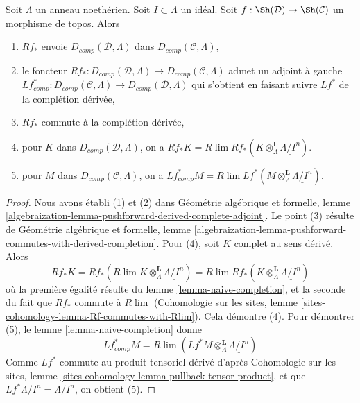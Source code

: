 \begin{lemma}
\label{lemma-pushforward-Noetherian-case}
Soit $\Lambda$ un anneau noethérien. Soit $I \subset \Lambda$ un idéal.
Soit $f : \Sh(\mathcal{D}) \to \Sh(\mathcal{C})$ un morphisme de topos.
Alors
\begin{enumerate}
\item $Rf_*$ envoie $D_{comp}(\mathcal{D}, \Lambda)$
dans $D_{comp}(\mathcal{C}, \Lambda)$,
\item le foncteur $Rf_* : D_{comp}(\mathcal{D}, \Lambda) \to
D_{comp}(\mathcal{C}, \Lambda)$ admet un adjoint à gauche
$Lf_{comp}^* : D_{comp}(\mathcal{C}, \Lambda) \to
D_{comp}(\mathcal{D}, \Lambda)$ qui s'obtient en faisant suivre $Lf^*$ de la
complétion dérivée,
\item $Rf_*$ commute à la complétion dérivée,
\item pour $K$ dans $D_{comp}(\mathcal{D}, \Lambda)$, on a
$Rf_*K = R\lim Rf_*(K \otimes^\mathbf{L}_\Lambda \underline{\Lambda/I^n})$.
\item pour $M$ dans $D_{comp}(\mathcal{C}, \Lambda)$, on a
$Lf^*_{comp}M =
R\lim Lf^*(M \otimes^\mathbf{L}_\Lambda \underline{\Lambda/I^n})$.
\end{enumerate}
\end{lemma}

\begin{proof}
Nous avons établi (1) et (2) dans
Géométrie algébrique et formelle, lemme
\ref{algebraization-lemma-pushforward-derived-complete-adjoint}.
Le point (3) résulte de
Géométrie algébrique et formelle, lemme
\ref{algebraization-lemma-pushforward-commutes-with-derived-completion}.
Pour (4), soit $K$ complet au sens dérivé. Alors
$$
Rf_*K = Rf_*( R\lim K \otimes^\mathbf{L}_\Lambda \underline{\Lambda/I^n}) =
R\lim Rf_*(K \otimes^\mathbf{L}_\Lambda \underline{\Lambda/I^n})
$$
où la première égalité résulte du lemme \ref{lemma-naive-completion},
et la seconde du fait que $Rf_*$ commute à $R\lim$
(Cohomologie sur les sites, lemme
\ref{sites-cohomology-lemma-Rf-commutes-with-Rlim}). Cela démontre (4).
Pour démontrer (5), le lemme \ref{lemma-naive-completion} donne
$$
Lf_{comp}^*M =
R\lim ( Lf^*M \otimes_\Lambda^\mathbf{L} \underline{\Lambda/I^n})
$$
Comme $Lf^*$ commute au produit tensoriel dérivé d'après
Cohomologie sur les sites, lemme \ref{sites-cohomology-lemma-pullback-tensor-product},
et que $Lf^*\underline{\Lambda/I^n} = \underline{\Lambda/I^n}$,
on obtient (5).
\end{proof}







